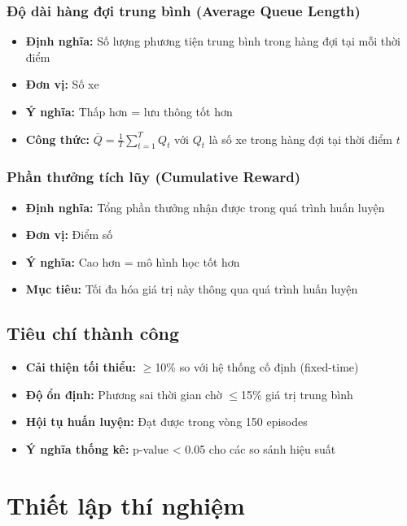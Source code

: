 \subsubsection{Độ dài hàng đợi trung bình (Average Queue Length)}
\begin{itemize}
    \item \textbf{Định nghĩa:} Số lượng phương tiện trung bình trong hàng đợi tại mỗi thời điểm
    \item \textbf{Đơn vị:} Số xe
    \item \textbf{Ý nghĩa:} Thấp hơn = lưu thông tốt hơn
    \item \textbf{Công thức:} $\bar{Q} = \frac{1}{T} \sum_{t=1}^{T} Q_t$ với $Q_t$ là số xe trong hàng đợi tại thời điểm $t$
\end{itemize}

\subsubsection{Phần thưởng tích lũy (Cumulative Reward)}
\begin{itemize}
    \item \textbf{Định nghĩa:} Tổng phần thưởng nhận được trong quá trình huấn luyện
    \item \textbf{Đơn vị:} Điểm số
    \item \textbf{Ý nghĩa:} Cao hơn = mô hình học tốt hơn
    \item \textbf{Mục tiêu:} Tối đa hóa giá trị này thông qua quá trình huấn luyện
\end{itemize}

\subsection{Tiêu chí thành công}
\begin{itemize}
    \item \textbf{Cải thiện tối thiểu:} $\geq$10\% so với hệ thống cố định (fixed-time)
    \item \textbf{Độ ổn định:} Phương sai thời gian chờ $\leq$15\% giá trị trung bình
    \item \textbf{Hội tụ huấn luyện:} Đạt được trong vòng 150 episodes
    \item \textbf{Ý nghĩa thống kê:} p-value < 0.05 cho các so sánh hiệu suất
\end{itemize}

\section{Thiết lập thí nghiệm}


